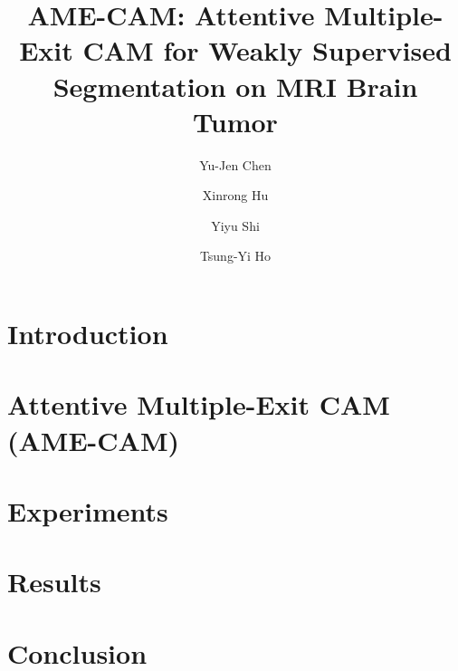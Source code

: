 \documentclass[runningheads]{llncs}
\begin{document}
%
\title{AME-CAM: Attentive Multiple-Exit CAM for Weakly Supervised Segmentation on MRI Brain Tumor}

\author{Yu-Jen Chen
\and Xinrong Hu
\and Yiyu Shi
\and Tsung-Yi Ho}



%
\maketitle              %
%
\begin{abstract}

\end{abstract}

\section{Introduction}
\label{sec:intro}


% 

\section{Attentive Multiple-Exit CAM (AME-CAM)}
\label{sec:methodology}


\section{Experiments}
\label{sec:experiments}


\section{Results}
\label{sec:results}




\section{Conclusion}
\label{sec:conclusion}


{\small


}
\end{document}
